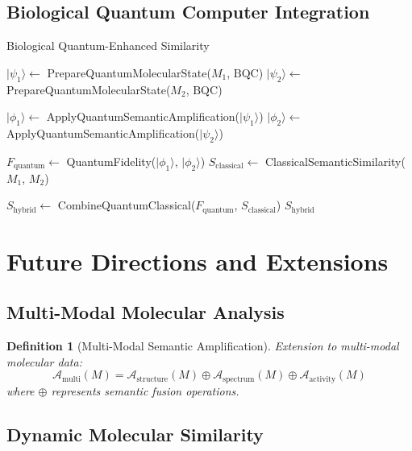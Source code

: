 \documentclass[12pt,a4paper]{article}
\newtheorem{definition}[theorem]{Definition}
\begin{document}
\subsection{Biological Quantum Computer Integration}

\begin{algorithm}[H]
\caption{Biological Quantum-Enhanced Similarity}
\begin{algorithmic}[1]
    \State $|\psi_1\rangle \gets$ PrepareQuantumMolecularState($M_1$, $\text{BQC}$)
    \State $|\psi_2\rangle \gets$ PrepareQuantumMolecularState($M_2$, $\text{BQC}$)

    \State $|\phi_1\rangle \gets$ ApplyQuantumSemanticAmplification($|\psi_1\rangle$)
    \State $|\phi_2\rangle \gets$ ApplyQuantumSemanticAmplification($|\psi_2\rangle$)

    \State $F_{\text{quantum}} \gets$ QuantumFidelity($|\phi_1\rangle$, $|\phi_2\rangle$)
    \State $S_{\text{classical}} \gets$ ClassicalSemanticSimilarity($M_1$, $M_2$)

    \State $S_{\text{hybrid}} \gets$ CombineQuantumClassical($F_{\text{quantum}}$, $S_{\text{classical}}$)
    \State \Return $S_{\text{hybrid}}$
\EndProcedure
\end{algorithmic}
\end{algorithm}

\section{Future Directions and Extensions}

\subsection{Multi-Modal Molecular Analysis}

\begin{definition}[Multi-Modal Semantic Amplification]
Extension to multi-modal molecular data:
\begin{equation}
\mathcal{A}_{\text{multi}}(M) = \mathcal{A}_{\text{structure}}(M) \oplus \mathcal{A}_{\text{spectrum}}(M) \oplus \mathcal{A}_{\text{activity}}(M)
\end{equation}
where $\oplus$ represents semantic fusion operations.
\end{definition}

\subsection{Dynamic Molecular Similarity}
\end{document}

